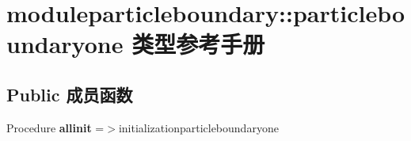 \hypertarget{structmoduleparticleboundary_1_1particleboundaryone}{}\section{moduleparticleboundary\+::particleboundaryone 类型参考手册}
\label{structmoduleparticleboundary_1_1particleboundaryone}
\subsection*{Public 成员函数}
\begin{DoxyCompactItemize}
\item 
\mbox{\label{structmoduleparticleboundary_1_1particleboundaryone_a8bcebb0b9c17cf5c302c12be04d2d4f2}} 
Procedure {\bfseries allinit} =$>$initializationparticleboundaryone
\end{DoxyCompactItemize}

